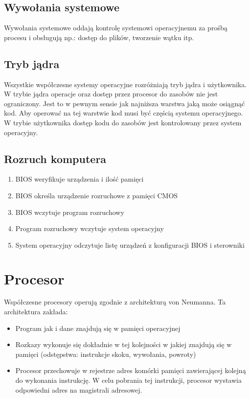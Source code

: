 \documentclass{../notatki}
\begin{document}
\subsection{Wywołania systemowe}

Wywołania systemowe oddają kontrolę systemowi operacyjnemu za prośbą
procesu i obsługują np.: dostęp do plików, tworzenie wątku itp.

\subsection{Tryb jądra}

Wszystkie współczesne systemy operacyjne rozróżniają tryb jądra i użytkownika.
W trybie jądra operacje oraz dostęp przez procesor do zasobów nie
jest ograniczony.
Jest to w pewnym sensie jak najniższa warstwa jaką może osiągnąć kod.
Aby operować na tej warstwie kod musi być częścią systemu operacyjnego.
W trybie użytkownika dostęp kodu do zasobów jest kontrolowany przez
system operacyjny.

\subsection{Rozruch komputera}

\begin{enumerate}
  \item BIOS weryfikuje urządzenia i ilość pamięci
  \item BIOS określa urządzenie rozruchowe z pamięci CMOS
  \item BIOS wczytuje program rozruchowy
  \item Program rozruchowy wczytuje system operacyjny
  \item System operacyjny odczytuje listę urządzeń z konfiguracji
    BIOS i sterowniki
\end{enumerate}

\section{Procesor}

Współczesne procesory operują zgodnie z architekturą von Neumanna. Ta
architektura zakłada:

\begin{itemize}
  \item Program jak i dane znajdują się w pamięci operacyjnej
  \item Rozkazy wykonuje się dokładnie w tej kolejności w jakiej
    znajdują się w pamięci (odstępstwa: instrukcje skoku, wywołania, powroty)
  \item Procesor przechowuje w rejestrze adres komórki pamięci
    zawierającej kolejną do wykonania instrukcję. W celu pobrania tej
    instrukcji, procesor wystawia odpowiedni adres na magistrali adresowej.
\end{itemize}
\end{document}
